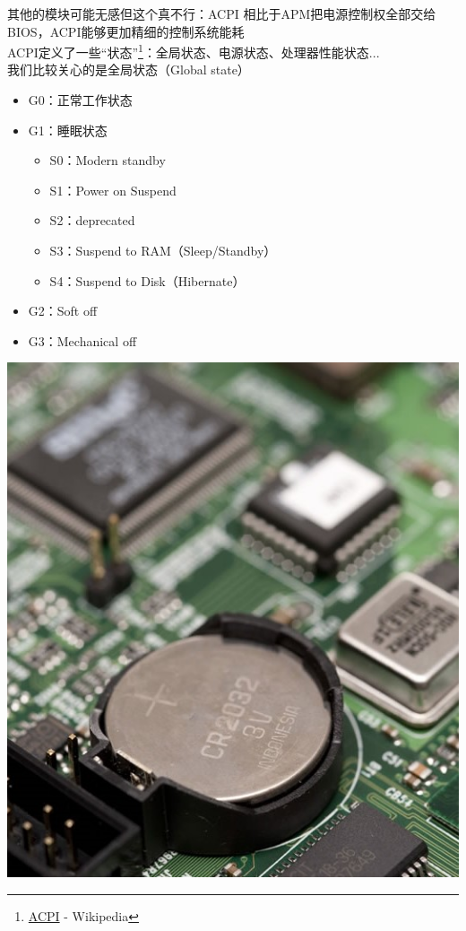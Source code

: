 \documentclass[aspectratio=1610]{beamer}
\begin{document}
\begin{frame}{其他的模块可能无感但这个真不行：ACPI}
    相比于APM把电源控制权全部交给BIOS，ACPI能够更加精细的控制系统能耗 \\[1em]

    ACPI定义了一些“状态”\footnote{\href{https://en.wikipedia.org/wiki/ACPI}{ACPI} - Wikipedia}：全局状态、电源状态、处理器性能状态... \\
    我们比较关心的是全局状态（Global state）
    \begin{minipage}{0.6\linewidth}
        \begin{center}
            \begin{itemize}
                \item G0：正常工作状态
                \item G1：睡眠状态
                    \begin{itemize}
                        \item \alert{S0：Modern standby}
                        \item S1：Power on Suspend
                        \item S2：deprecated
                        \item S3：Suspend to RAM（Sleep/Standby）
                        \item S4：Suspend to Disk（Hibernate）
                    \end{itemize}
                \item G2：Soft off
                \item G3：Mechanical off
            \end{itemize}
        \end{center}
    \end{minipage}
    \begin{minipage}{0.3\linewidth}
        \centering
        \includegraphics[width=\linewidth]{pic/lithium_bios_battery.jpg}

\end{minipage}
\end{frame}
\end{document}
